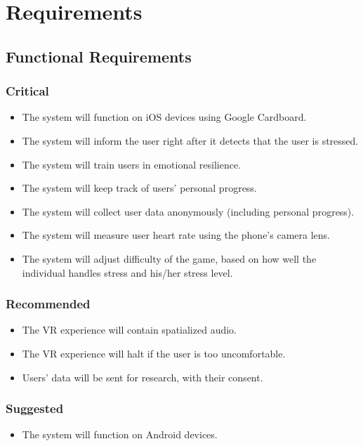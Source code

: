 \chapter{Requirements} %

\section{Functional Requirements}
    \subsection{Critical}
        \begin{itemize}
            \item The system will function on iOS devices using Google Cardboard.
            \item The system will inform the user right after it detects that the user is stressed.
            \item The system will train users in emotional resilience.
            \item 	The system will keep track of users' personal progress.
            \item The system will collect user data anonymously (including personal progress).
            \item The system will measure user heart rate using the phone's camera lens.
            \item The system will adjust difficulty of the game, based on how well the individual handles stress and his/her stress level.
\end{itemize}
    \subsection{Recommended}
        \begin{itemize}
            \item The VR experience will contain spatialized audio.
            \item The VR experience will halt if the user is too uncomfortable. 
            \item Users' data will be sent for research, with their consent.
        \end{itemize}
    \subsection{Suggested}
        \begin{itemize}
            \item The system will function on Android devices.
        \end{itemize}
